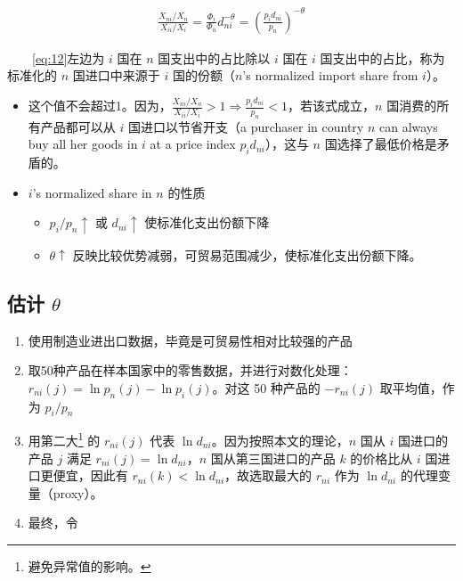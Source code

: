 \documentclass[
]{article}
\providecommand{\tightlist}{%
  \setlength{\itemsep}{0pt}\setlength{\parskip}{0pt}}
\begin{document}
\begin{align}
\frac{X_{n i} / X_{n}}{X_{i i} / X_{i}}=\frac{\Phi_{i}}{\Phi_{n}} d_{n i}^{-\theta}=\left(\frac{p_{i} d_{n i}}{p_{n}}\right)^{-\theta} \label{eq:12}
\end{align}

　　\eqref{eq:12}左边为 \(i\) 国在 \(n\) 国支出中的占比除以 \(i\) 国在 \(i\) 国支出中的占比，称为标准化的 \(n\) 国进口中来源于 \(i\) 国的份额（\(n\)'s normalized import share from \(i\)）。

\begin{itemize}
\tightlist
\item
  这个值不会超过1。因为，\(\frac{X_{n i} / X_{n}}{X_{i i} / X_{i}}>1 \Rightarrow \frac{p_{i} d_{n i}}{p_{n}}<1\)，若该式成立，\(n\) 国消费的所有产品都可以从 \(i\) 国进口以节省开支（a purchaser in country \(n\) can always buy all her goods in \(i\) at a price index \(p_{i} d_{n i}\)），这与 \(n\) 国选择了最低价格是矛盾的。\\
\item
  \(i\)'s normalized share in \(n\) 的性质

  \begin{itemize}
  \tightlist
  \item
    \(p_i/p_n \uparrow\) 或 \(d_{ni} \uparrow\) 使标准化支出份额下降\\
  \item
    \(\theta \uparrow\) 反映比较优势减弱，可贸易范围减少，使标准化支出份额下降。
  \end{itemize}
\end{itemize}

\hypertarget{ux4f30ux8ba1-theta}{%
\subsection{\texorpdfstring{估计 \(\theta\)}{估计 \textbackslash theta}}\label{ux4f30ux8ba1-theta}}

\begin{enumerate}
\def\labelenumi{\arabic{enumi}.}
\tightlist
\item
  使用制造业进出口数据，毕竟是可贸易性相对比较强的产品\\
\item
  取50种产品在样本国家中的零售数据，并进行对数化处理：\(r_{n i}(j)=\ln p_{n}(j)-\ln p_{i}(j)\)。对这 50 种产品的 \(-r_{n i}(j)\) 取平均值，作为 \(p_i/p_n\)\\
\item
  用第二大\footnote{避免异常值的影响。} 的 \(r_{n i}(j)\) 代表 \(\ln d_{ni}\)。因为按照本文的理论，\(n\) 国从 \(i\) 国进口的产品 \(j\) 满足 \(r_{n i}(j)=\ln d_{ni}\)，\(n\) 国从第三国进口的产品 \(k\) 的价格比从 \(i\) 国进口更便宜，因此有 \(r_{n i}(k)<\ln d_{ni}\)，故选取最大的 \(r_{n i}\) 作为 \(\ln d_{ni}\) 的代理变量（proxy）。
\item
  最终，令
\end{enumerate}
\end{document}
